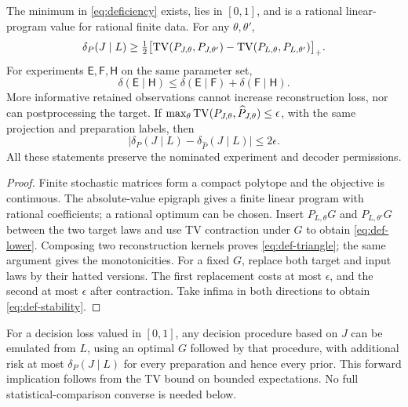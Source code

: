 \begin{proposition}\label{p2-06}
The minimum in \cref{eq:deficiency} exists, lies in \([0,1]\), and is a rational linear-program value for rational finite data. For any \(\theta,\theta'\),
\begin{equation}\label{eq:def-lower}
 \delta_P(J\mid L)\ge \tfrac12\bigl[
 \operatorname{TV}(P_{J,\theta},P_{J,\theta'})-
 \operatorname{TV}(P_{L,\theta},P_{L,\theta'})\bigr]_+.
\end{equation}
For experiments \(\mathsf E,\mathsf F,\mathsf H\) on the same parameter set,
\begin{equation}\label{eq:def-triangle}
 \delta(\mathsf E\mid\mathsf H)
 \le \delta(\mathsf E\mid\mathsf F)+\delta(\mathsf F\mid\mathsf H).
\end{equation}
More informative retained observations cannot increase reconstruction loss, nor can postprocessing the target. If \(\max_\theta\operatorname{TV}(P_{J,\theta},\widehat P_{J,\theta})\le\epsilon\), with the same projection and preparation labels, then
\begin{equation}\label{eq:def-stability}
 \bigl|\delta_P(J\mid L)-\delta_{\widehat P}(J\mid L)\bigr|\le2\epsilon.
\end{equation}
All these statements preserve the nominated experiment and decoder permissions.
\end{proposition}
\begin{proof}
Finite stochastic matrices form a compact polytope and the objective is continuous. The absolute-value epigraph gives a finite linear program with rational coefficients; a rational optimum can be chosen. Insert \(P_{L,\theta}G\) and \(P_{L,\theta'}G\) between the two target laws and use TV contraction under \(G\) to obtain \cref{eq:def-lower}. Composing two reconstruction kernels proves \cref{eq:def-triangle}; the same argument gives the monotonicities. For a fixed \(G\), replace both target and input laws by their hatted versions. The first replacement costs at most \(\epsilon\), and the second at most \(\epsilon\) after contraction. Take infima in both directions to obtain \cref{eq:def-stability}.
\end{proof}
For a decision loss valued in \([0,1]\), any decision procedure based on \(J\) can be emulated from \(L\), using an optimal \(G\) followed by that procedure, with additional risk at most \(\delta_P(J\mid L)\) for every preparation and hence every prior. This forward implication follows from the TV bound on bounded expectations. No full statistical-comparison converse is needed below.

